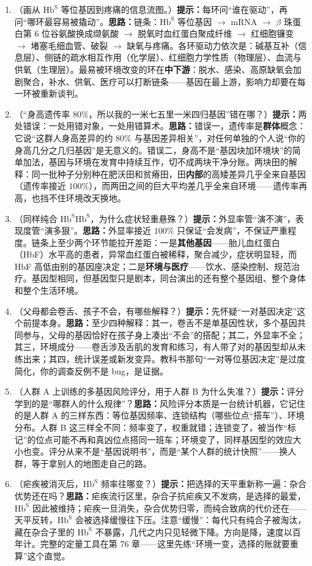 \begin{enumerate}[itemsep=3pt]
\item （画从 $\mathrm{Hb^{S}}$ 等位基因到疼痛的信息流图。）\textbf{提示：}每环问“谁在驱动”，再问“哪环最容易被撬动”。\textbf{思路：}链条：$\mathrm{Hb^{S}}$ 等位基因 $\rightarrow$ mRNA $\rightarrow$ $\beta$ 珠蛋白第 6 位谷氨酸换成缬氨酸 $\rightarrow$ 脱氧时血红蛋白聚成纤维 $\rightarrow$ 红细胞镰变 $\rightarrow$ 堵塞毛细血管、破裂 $\rightarrow$ 缺氧与疼痛。各环驱动力依次是：碱基互补（信息层）、侧链的疏水相互作用（化学层）、红细胞力学性质（物理层）、血流与供氧（生理层）。最易被环境改变的环在\textbf{中下游}：脱水、感染、高原缺氧会加剧聚合，补水、供氧、医疗可以打断链条——基因在最上游，影响力却要在每一环被重新谈判。
\item （“身高遗传率 $80\%$，所以我的一米七五里一米四归基因”错在哪？）\textbf{提示：}两处错误：一处用错对象，一处用错算术。\textbf{思路：}错误一，遗传率是\textbf{群体}概念：它说“这群人身高差异的约 $80\%$ 与基因差异相关”，对任何单独的个人说“你的身高几分之几归基因”是无意义的。错误二，身高不是“基因块加环境块”的简单加法，基因与环境在发育中持续互作，切不成两块干净分账。两块田的解释：同一批种子分别种在肥沃田和贫瘠田，田\textbf{内部}的高矮差异几乎全来自基因（遗传率接近 $100\%$），而两田之间的巨大平均差几乎全来自环境——遗传率再高，也挡不住环境改天换地。
\item （同样纯合 $\mathrm{Hb^{S}Hb^{S}}$，为什么症状轻重悬殊？）\textbf{提示：}外显率管“演不演”，表现度管“演多狠”。\textbf{思路：}外显率接近 $100\%$ 只保证“会发病”，不保证严重程度。链条上至少两个环节能拉开差距：一是\textbf{其他基因}——胎儿血红蛋白（HbF）水平高的患者，异常血红蛋白被稀释，聚合减少，症状明显轻，而 HbF 高低由别的基因座决定；二是\textbf{环境与医疗}——饮水、感染控制、规范治疗。基因型相同，但基因型只是剧本，同台演出的还有整个基因组、整个身体和整个生活环境。
\item （父母都会卷舌、孩子不会，有哪些解释？）\textbf{提示：}先怀疑“一对基因决定”这个前提本身。\textbf{思路：}至少四种解释：其一，卷舌不是单基因性状，多个基因共同参与，父母的基因恰好在孩子身上凑出“不会”的搭配；其二，外显率不全；其三，环境成分——卷舌涉及舌肌的发育和练习，有人带了对的基因型却从未练出来；其四，统计误差或新发变异。教科书那句“一对等位基因决定”是过度简化，你的调查反例不是 bug，是证据。
\item （人群 A 上训练的多基因风险评分，用于人群 B 为什么失准？）\textbf{提示：}评分学到的是“哪群人的什么规律”？\textbf{思路：}风险评分本质是一台统计机器，它记住的是人群 A 的三样东西：等位基因频率、连锁结构（哪些位点“搭车”）、环境分布。人群 B 这三样全不同：频率变了，权重就错；连锁变了，被当作“标记”的位点可能不再和真凶位点搭同一班车；环境变了，同样基因型的效应大小也变。评分从来不是“基因说明书”，而是“某个人群的统计快照”——换人群，等于拿别人的地图走自己的路。
\item （疟疾被消灭后，$\mathrm{Hb^{S}}$ 频率往哪变？）\textbf{提示：}把选择的天平重新称一遍：杂合优势还在吗？\textbf{思路：}疟疾流行区里，杂合子抗疟疾又不发病，是选择的最爱，$\mathrm{Hb^{S}}$ 因此被维持；疟疾一旦消失，杂合优势归零，而纯合致病的代价还在——天平反转，$\mathrm{Hb^{S}}$ 会被选择缓慢往下压。注意“缓慢”：每代只有纯合子被淘汰，藏在杂合子里的 $\mathrm{Hb^{S}}$ 不暴露，几代之内只见轻微下降。方向是降，速度以百年计。完整的定量工具在第 76 章——这里先练“环境一变，选择的账就要重算”这个直觉。
\end{enumerate}

